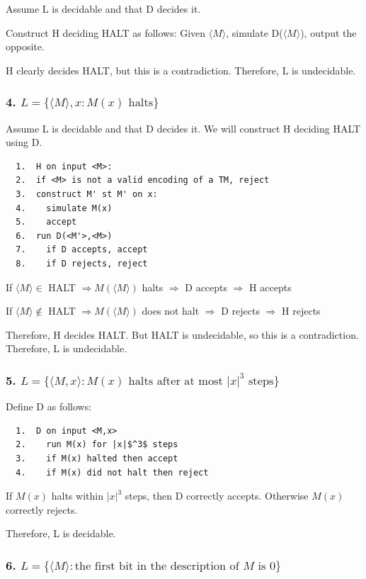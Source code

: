 \documentclass[letterpaper]{article}
\begin{document}
Assume L is decidable and that D decides it.

Construct H deciding HALT as follows:
Given $\langle M \rangle$, simulate D($\langle M \rangle$), output the opposite.

H clearly decides HALT, but this is a contradiction.
Therefore, L is undecidable.

\subsubsection*{4. $L=\{\langle M \rangle,x : M (x ) \text{ halts}\}$}

Assume L is decidable and that D decides it.
We will construct H deciding HALT using D.

\begin{verbatim}
  1.  H on input <M>:
  2.  if <M> is not a valid encoding of a TM, reject 
  3.  construct M' st M' on x:
  4.    simulate M(x)
  5.    accept 
  6.  run D(<M'>,<M>)
  7.    if D accepts, accept 
  8.    if D rejects, reject
\end{verbatim}

If $\langle M \rangle \in$ HALT
$\Rightarrow M(\langle M \rangle)$ halts
$\Rightarrow $ D accepts
$\Rightarrow$ H accepts

If $\langle M \rangle \notin$ HALT
$\Rightarrow M(\langle M \rangle)$ does not halt
$\Rightarrow $ D rejects
$\Rightarrow$ H rejects

Therefore, H decides HALT. But HALT is undecidable,
so this is a contradiction. Therefore, L is undecidable.

\subsubsection*{5. $L = \{ \langle M, x \rangle : M(x) \text{ halts after at most } |x|^3 \text{ steps} \}$}

Define D as follows:
\begin{lstlisting}
  1.  D on input <M,x>
  2.    run M(x) for |x|$^3$ steps
  3.    if M(x) halted then accept 
  4.    if M(x) did not halt then reject
\end{lstlisting}

If $M(x)$ halts within $|x|^3$ steps, then D correctly accepts.
Otherwise $M(x)$ correctly rejects.

Therefore, L is decidable.

\subsubsection*{6. $L = \{ \langle M \rangle : \text{the first bit in the description of } M \text{ is } 0 \}$}
\end{document}
